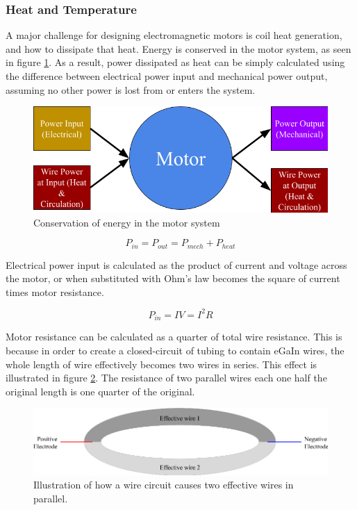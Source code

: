 \documentclass[a4paper,12pt]{article}
\begin{document}
\subsubsection{Heat and Temperature}

A major challenge for designing electromagnetic motors is coil heat generation, and how to dissipate that heat. Energy is conserved in the motor system, as seen in figure \ref{fg:motorheat}. As a result, power dissipated as heat can be simply calculated using the difference between electrical power input and mechanical power output, assuming no other power is lost from or enters the system.

\begin{figure}[h!]
    \centering
    \includegraphics[scale=0.4]{motorheat.png}
    \caption{Conservation of energy in the motor system}
    \label{fg:motorheat}
    \end{figure}
    \begin{equation}\label{eq:pbreakdown}
    P_{in}=P_{out}=P_{mech}+P_{heat}
\end{equation}

Electrical power input is calculated as the product of current and voltage across the motor, or when substituted with Ohm's law becomes the square of current times motor resistance.

\begin{equation}\label{eq:pin}
    P_{in} = IV = I^2R
\end{equation}

Motor resistance can be calculated as a quarter of total wire resistance. This is because in order to create a closed-circuit of tubing to contain eGaIn wires, the whole length of wire effectively becomes two wires in series. This effect is illustrated in figure \ref{fg:parallelwire}. The resistance of two parallel wires each one half the original length is one quarter of the original.

\begin{figure}[h!]
    \centering
    \includegraphics[scale=0.4]{parallelwire.png}
    \caption{Illustration of how a wire circuit causes two effective wires in parallel.}
    \label{fg:parallelwire}
\end{figure}
\end{document}
